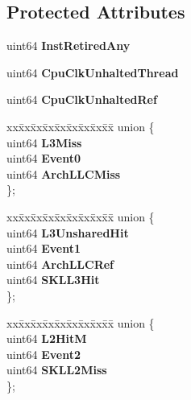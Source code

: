\subsection*{Protected Attributes}
\begin{DoxyCompactItemize}
\item 
\mbox{\label{class_basic_counter_state_a32d89649ba3e48ad8d0cfe05b0e5e2fb}} 
uint64 {\bfseries Inst\+Retired\+Any}
\item 
\mbox{\label{class_basic_counter_state_aa55976b14e3f5d61eac958ea5f80f35c}} 
uint64 {\bfseries Cpu\+Clk\+Unhalted\+Thread}
\item 
\mbox{\label{class_basic_counter_state_a9c64ac8f2c735b0a693a066ff99b9bc1}} 
uint64 {\bfseries Cpu\+Clk\+Unhalted\+Ref}
\item 
\mbox{\label{class_basic_counter_state_a9c856f4d132a302df428e99c817091ee}} 
\begin{tabbing}
xx\=xx\=xx\=xx\=xx\=xx\=xx\=xx\=xx\=\kill
union \{\\
\>uint64 {\bfseries L3Miss}\\
\>uint64 {\bfseries Event0}\\
\>uint64 {\bfseries ArchLLCMiss}\\
\}; \\

\end{tabbing}\item 
\mbox{\label{class_basic_counter_state_aa6cccd8d4cc29533223ceefd67d6aa36}} 
\begin{tabbing}
xx\=xx\=xx\=xx\=xx\=xx\=xx\=xx\=xx\=\kill
union \{\\
\>uint64 {\bfseries L3UnsharedHit}\\
\>uint64 {\bfseries Event1}\\
\>uint64 {\bfseries ArchLLCRef}\\
\>uint64 {\bfseries SKLL3Hit}\\
\}; \\

\end{tabbing}\item 
\mbox{\label{class_basic_counter_state_a462224d3abe90b0d919dbd3862e8b82d}} 
\begin{tabbing}
xx\=xx\=xx\=xx\=xx\=xx\=xx\=xx\=xx\=\kill
union \{\\
\>uint64 {\bfseries L2HitM}\\
\>uint64 {\bfseries Event2}\\
\>uint64 {\bfseries SKLL2Miss}\\
\}; \\


\end{tabbing}
\end{DoxyCompactItemize}
